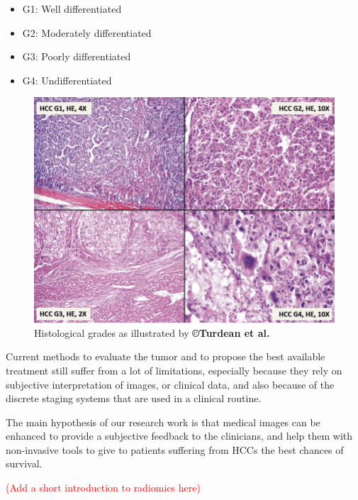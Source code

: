 \documentclass[]{article}
\begin{document}
\begin{itemize}
\item
  G1: Well differentiated
\item
  G2: Moderately differentiated
\item
  G3: Poorly differentiated
\item
  G4: Undifferentiated
\end{itemize}


\begin{figure}[th!]
\centering
\includegraphics[width=0.7\linewidth]{images/image7}
\caption{Histological grades as illustrated by \textbf{©Turdean et al.} \cite{Turdean2012}}
\label{HistologicalGrades}
\end{figure}


Current methods to evaluate the tumor and to propose the best available
treatment still suffer from a lot of limitations, especially because
they rely on subjective interpretation of images, or clinical data, and
also because of the discrete staging systems that are used in a clinical
routine.

The main hypothesis of our research work is that medical images can be
enhanced to provide a subjective feedback to the clinicians, and help
them with non-invasive tools to give to patients suffering from
HCCs the best chances of survival.

\textcolor{red}{(Add a short introduction to radiomics here)}


\newpage


\end{document}
